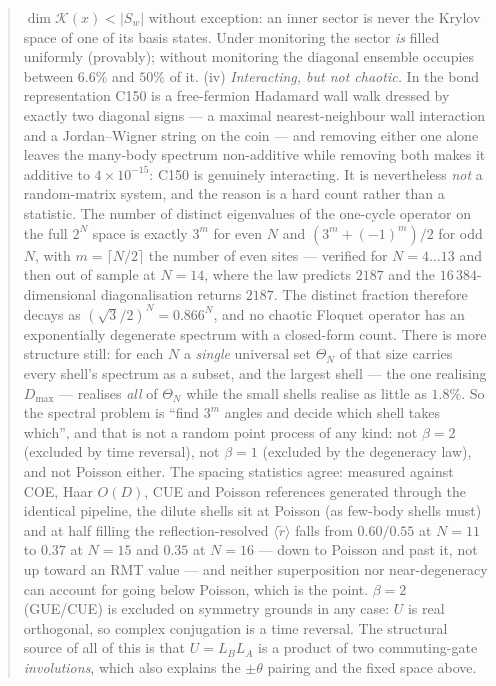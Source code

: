 \documentclass[11pt]{article}
\theoremstyle{plain}
\theoremstyle{definition}
\begin{document}
\begin{abstract}
$\dim\mathcal{K}(x) < |S_w|$ without exception: an inner sector is never the
Krylov space of one of its basis states. Under monitoring the sector \emph{is}
filled uniformly (provably); without monitoring the diagonal ensemble occupies
between $6.6\%$ and $50\%$ of it.
(iv) \emph{Interacting, but not chaotic.} In the bond representation C150 is a
free-fermion Hadamard wall walk dressed by exactly two diagonal signs --- a
maximal nearest-neighbour wall interaction and a Jordan--Wigner string on the
coin --- and removing either one alone leaves the many-body spectrum
non-additive while removing both makes it additive to $4\times10^{-15}$: C150 is
genuinely interacting. It is nevertheless \emph{not} a random-matrix system, and
the reason is a hard count rather than a statistic. The number of distinct
eigenvalues of the one-cycle operator on the full $2^N$ space is exactly
$3^{m}$ for even $N$ and $(3^{m}+(-1)^m)/2$ for odd $N$, with
$m=\lceil N/2\rceil$ the number of even sites --- verified for $N=4\ldots13$ and
then out of sample at $N=14$, where the law predicts $2187$ and the
$16\,384$-dimensional diagonalisation returns $2187$. The distinct fraction
therefore decays as $(\sqrt3/2)^N = 0.866^N$, and no chaotic Floquet operator has
an exponentially degenerate spectrum with a closed-form count. There is more
structure still: for each $N$ a \emph{single} universal set $\Theta_N$ of that
size carries every shell's spectrum as a subset, and the largest shell --- the
one realising $D_{\max}$ --- realises \emph{all} of $\Theta_N$ while the small
shells realise as little as $1.8\%$. So the spectral problem is ``find $3^m$
angles and decide which shell takes which'', and that is not a random point
process of any kind: not $\beta=2$ (excluded by time reversal), not $\beta=1$
(excluded by the degeneracy law), and not Poisson either. The spacing statistics
agree: measured against COE, Haar $O(D)$, CUE and Poisson references
generated through the identical pipeline, the dilute shells sit at Poisson (as
few-body shells must) and at half filling the reflection-resolved
$\langle\tilde r\rangle$ falls from $0.60/0.55$ at $N=11$ to $0.37$ at $N=15$ and
$0.35$ at $N=16$ --- down to Poisson and past it, not up toward an RMT value ---
and neither superposition nor near-degeneracy can account for going below
Poisson, which is the point. $\beta=2$ (GUE/CUE) is excluded on symmetry grounds in any case:
$U$ is real orthogonal, so complex conjugation is a time reversal. The structural
source of all of this is that $U=L_BL_A$ is a product of two commuting-gate
\emph{involutions}, which also explains the $\pm\theta$ pairing and the fixed
space above.
\end{abstract}
\end{document}
